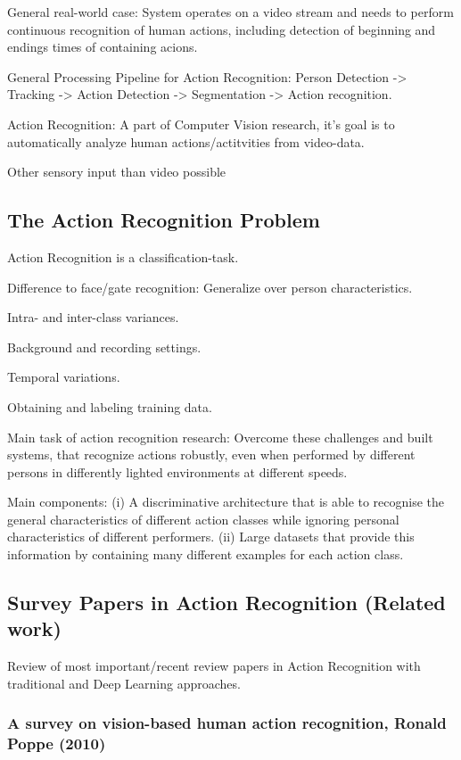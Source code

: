 General real-world case: System operates on a video stream and needs to perform continuous recognition of human actions, including detection of beginning and endings times of containing acions.

General Processing Pipeline for Action Recognition: Person Detection -> Tracking -> Action Detection -> Segmentation -> Action recognition.

Action Recognition: A part of Computer Vision research, it's goal is to automatically analyze human actions/actitvities from video-data.

Other sensory input than video possible 

\subsection{The Action Recognition Problem}
Action Recognition is a classification-task.

Difference to face/gate recognition: Generalize over person characteristics.

Intra- and inter-class variances.

Background and recording settings.

Temporal variations.

Obtaining and labeling training data.

Main task of action recognition research: Overcome these challenges and built systems, that recognize actions robustly, even when performed by different persons in differently lighted environments at different speeds.

Main components: (i) A discriminative architecture that is able to recognise the general characteristics of different action classes while ignoring personal characteristics of different performers.
(ii) Large datasets that provide this information by containing many different examples for each action class.

\subsection{Survey Papers in Action Recognition (Related work)}
\label{sec:relatedwork}

Review of most important/recent review papers in Action Recognition with traditional and Deep Learning approaches.

\subsubsection{A survey on vision-based human action recognition, Ronald Poppe (2010)}

